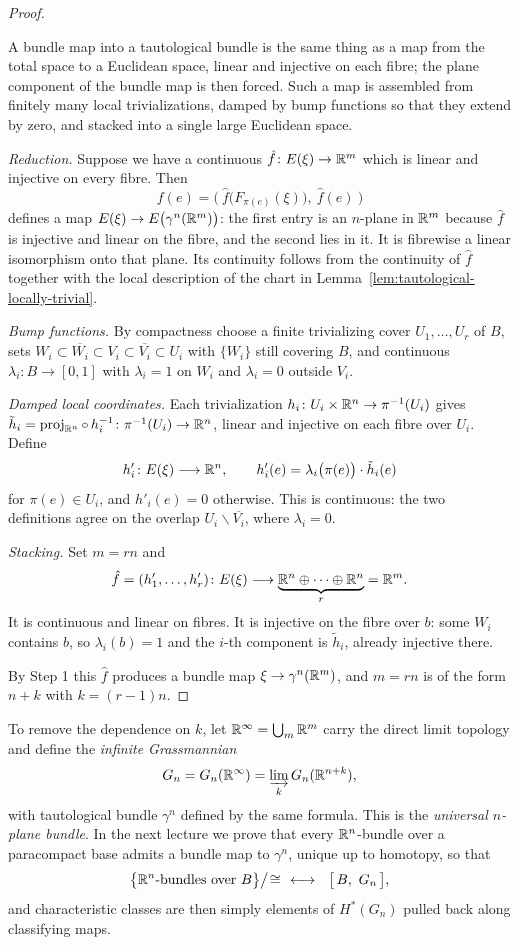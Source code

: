 \begin{proof}
\begin{strategy}
A bundle map into a tautological bundle is the same thing as a map from the
total space to a Euclidean space, linear and injective on each fibre; the plane
component of the bundle map is then forced. Such a map is assembled from
finitely many local trivializations, damped by bump functions so that they
extend by zero, and stacked into a single large Euclidean space.
\end{strategy}

 \emph{Reduction.} Suppose we have a continuous
$\hat f\colon E(\xi)\to\mathbb{R}^m$ which is linear and injective on every fibre. Then
\[
f(e)=\Big(\ \hat f\big(F_{\pi(e)}(\xi)\big),\ \hat f(e)\ \Big)
\]
defines a map $E(\xi)\to E\big(\gamma^n(\mathbb{R}^m)\big)$: the first entry is an
$n$-plane in $\mathbb{R}^m$ because $\hat f$ is injective and linear on the fibre, and
the second lies in it. It is fibrewise a linear isomorphism onto that plane. Its
continuity follows from the continuity of $\hat f$ together with the local
description of the chart in Lemma~\ref{lem:tautological-locally-trivial}.

 \emph{Bump functions.} By compactness choose a finite trivializing
cover $U_1,\dots,U_r$ of $B$, sets $W_i\subset\overline{W_i}\subset V_i\subset
\overline{V_i}\subset U_i$ with $\{W_i\}$ still covering $B$, and continuous
$\lambda_i\colon B\to[0,1]$ with $\lambda_i=1$ on $W_i$ and $\lambda_i=0$
outside $V_i$.

 \emph{Damped local coordinates.} Each trivialization
$h_i\colon U_i\times\mathbb{R}^n\to\pi^{-1}(U_i)$ gives
$\tilde h_i=\operatorname{proj}_{\mathbb{R}^n}\circ\,h_i^{-1}\colon\pi^{-1}(U_i)\to\mathbb{R}^n$, linear and
injective on each fibre over $U_i$. Define
\[
h'_i\colon E(\xi)\longrightarrow\mathbb{R}^n,
\qquad
h'_i(e)=\lambda_i\big(\pi(e)\big)\cdot\tilde h_i(e)
\]
for $\pi(e)\in U_i$, and $h'_i(e)=0$ otherwise. This is continuous: the two
definitions agree on the overlap $U_i\smallsetminus \overline{V_i}$, where
$\lambda_i=0$.

 \emph{Stacking.} Set $m=rn$ and
\[
\hat f=(h'_1,\dots,h'_r)\colon E(\xi)\longrightarrow
\underbrace{\mathbb{R}^n\oplus\dots\oplus\mathbb{R}^n}_{r}=\mathbb{R}^{m}.
\]
It is continuous and linear on fibres. It is injective on the fibre over $b$:
some $W_i$ contains $b$, so $\lambda_i(b)=1$ and the $i$-th component is
$\tilde h_i$, already injective there.

 By Step 1 this $\hat f$ produces a bundle map
$\xi\to\gamma^n(\mathbb{R}^{m})$, and $m=rn$ is of the form $n+k$ with $k=(r-1)n$.
\end{proof}

To remove the dependence on $k$, let $\mathbb{R}^\infty=\bigcup_m\mathbb{R}^m$ carry the direct
limit topology and define the \emph{infinite Grassmannian}
\[
G_n=G_n(\mathbb{R}^\infty)=\varinjlim_k G_n(\mathbb{R}^{n+k}),
\]
with tautological bundle $\gamma^n$ defined by the same formula. This is the
\emph{universal $n$-plane bundle}. In the next lecture we prove that every
$\mathbb{R}^n$-bundle over a paracompact base admits a bundle map to $\gamma^n$, unique
up to homotopy, so that
\[
\big\{\mathbb{R}^n\text{-bundles over }B\big\}\big/\!\cong
\ \ \longleftrightarrow\ \
\big[\,B,\ G_n\,\big],
\]
and characteristic classes are then simply elements of $H^*(G_n)$ pulled back
along classifying maps.
